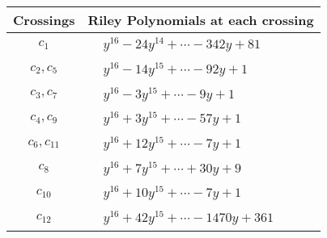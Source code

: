 \documentclass[1p]{elsarticle_modified}
\theoremstyle{definition}
\begin{document}
\begin{tabular}{m{50pt}|m{274pt}}
Crossings & \hspace{64pt}Riley Polynomials at each crossing \\
\hline $$\begin{aligned}c_{1}\end{aligned}$$&$\begin{aligned}
&y^{16}-24 y^{14}+\cdots-342 y+81
\end{aligned}$\\
\hline $$\begin{aligned}c_{2},c_{5}\end{aligned}$$&$\begin{aligned}
&y^{16}-14 y^{15}+\cdots-92 y+1
\end{aligned}$\\
\hline $$\begin{aligned}c_{3},c_{7}\end{aligned}$$&$\begin{aligned}
&y^{16}-3 y^{15}+\cdots-9 y+1
\end{aligned}$\\
\hline $$\begin{aligned}c_{4},c_{9}\end{aligned}$$&$\begin{aligned}
&y^{16}+3 y^{15}+\cdots-57 y+1
\end{aligned}$\\
\hline $$\begin{aligned}c_{6},c_{11}\end{aligned}$$&$\begin{aligned}
&y^{16}+12 y^{15}+\cdots-7 y+1
\end{aligned}$\\
\hline $$\begin{aligned}c_{8}\end{aligned}$$&$\begin{aligned}
&y^{16}+7 y^{15}+\cdots+30 y+9
\end{aligned}$\\
\hline $$\begin{aligned}c_{10}\end{aligned}$$&$\begin{aligned}
&y^{16}+10 y^{15}+\cdots-7 y+1
\end{aligned}$\\
\hline $$\begin{aligned}c_{12}\end{aligned}$$&$\begin{aligned}
&y^{16}+42 y^{15}+\cdots-1470 y+361
\end{aligned}$\\
\hline
\end{tabular}\\~\\
\end{document}

